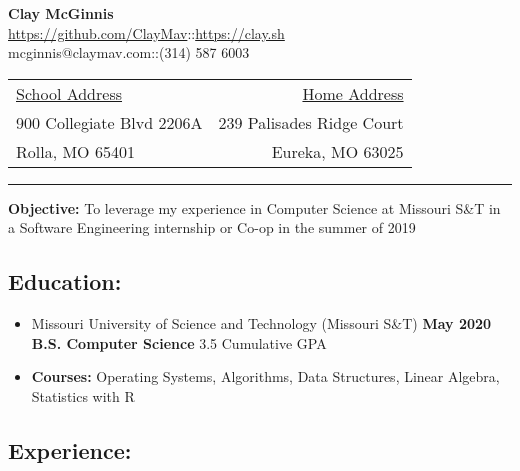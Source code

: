 \documentclass[9pt,oneside]{memoir}
\makeatletter
\newcommand{\name}{Clay McGinnis}
\newcommand{\phone}{(314) 587 6003}
\newcommand{\email}{mcginnis@claymav.com}
\newcommand{\github}{https://github.com/ClayMav}
\newcommand{\website}{https://clay.sh}
\newcommand{\cgpa}{3.5}
\makeatother
\begin{document}
 \selectfont

\begin{center}
  \textbf{\huge{\name}}\\
    \url{\github}\hspace*{10px}::\hspace*{10px}\url{\website}\\
    \email\hspace*{10px}::\hspace*{10px}\phone\\
\end{center}

\begin{tabular*}{\textwidth}{@{\extracolsep{\fill} } l r}
\underline{School Address} & \underline{Home Address}\\
900 Collegiate Blvd 2206A & 239 Palisades Ridge Court\\
Rolla, MO 65401 & Eureka, MO 63025\\
\end{tabular*}

\vspace{3pt} \rule{\textwidth}{1pt}\vspace{6pt}

\textbf{Objective:} To leverage my experience in Computer Science at Missouri S\&T in a Software Engineering internship or Co-op in the summer of 2019

\subsection*{Education:}

\begin{itemize}
  \item[] Missouri University of Science and Technology (Missouri S\&T)
    \hfill \textbf{May 2020}\\
        \textbf{B.S. Computer Science}
    \hfill \cgpa{} Cumulative GPA
  \item[] \textbf{Courses:} Operating Systems, Algorithms, Data Structures, Linear Algebra, Statistics with R
\end{itemize}

\subsection*{Experience:}
\end{document}
